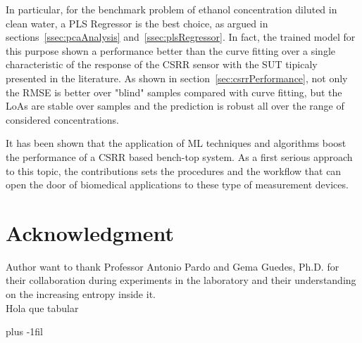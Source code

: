 \documentclass[journal,twoside,web]{ieeecolor}
\begin{document}
In particular, for the benchmark problem of ethanol concentration diluted in clean water, a PLS Regressor is the best choice, as argued in sections~\ref{ssec:pcaAnalysis} and~\ref{ssec:plsRegressor}. In fact, the trained model for this purpose shown a performance better than the curve fitting over a single characteristic of the response of the CSRR sensor with the SUT tipicaly presented in the literature. As shown in section~\ref{sec:csrrPerformance}, not only the RMSE is better over "blind" samples compared with curve fitting, but the LoAs are stable over samples and the prediction is robust all over the range of considered concentrations.    

It has been shown that the application of ML techniques and algorithms boost the performance of a CSRR based bench-top system. As a first serious approach to this topic, the contributions sets the procedures and the workflow that can open the door of biomedical applications to these type of measurement devices.

\section*{Acknowledgment}

Author want to thank Professor Antonio Pardo and Gema Guedes, Ph.D. for their collaboration during experiments in the laboratory and their understanding on the increasing entropy inside it.\\
Hola que tabular



\baselineskip plus -1fil
\end{document}

